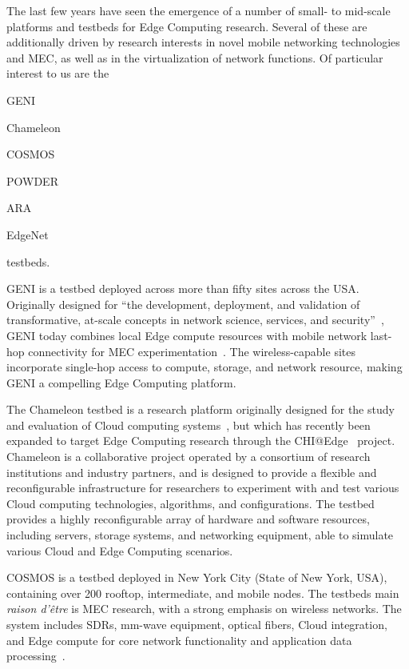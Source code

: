 The last few years have seen the emergence of a number of small- to mid-scale platforms and testbeds for Edge Computing research.
Several of these are additionally driven by research interests in novel mobile networking technologies and \gls{MEC}, as well as in the virtualization of network functions.
Of particular interest to us are the
\begin{inlineenum}
    \item \acs{GENI}
    \item Chameleon
    \item \acs{COSMOS}
    \item \acs{POWDER}
    \item \acs{ARA}
    \item EdgeNet
\end{inlineenum} testbeds.

\gls{GENI} is a testbed deployed across more than fifty sites across the \gls{USA}.
Originally designed for ``the development, deployment, and validation of transformative, at-scale concepts in network science, services, and security''~\cite{berman2014geni}, \gls{GENI} today combines local Edge compute resources with mobile network last-hop connectivity for \gls{MEC} experimentation~\cite{gosain2017geni}.
The wireless-capable sites incorporate single-hop access to compute, storage, and network resource, making \gls{GENI} a compelling Edge Computing platform.

The Chameleon testbed is a research platform originally designed for the study and evaluation of Cloud computing systems~\cite{keahey2020lessons}, but which has recently been expanded to target Edge Computing research through the \acs{CHI}@Edge~\cite{chiatedge} project.
Chameleon is a collaborative project operated by a consortium of research institutions and industry partners, and is designed to provide a flexible and reconfigurable infrastructure for researchers to experiment with and test various Cloud computing technologies, algorithms, and configurations.
The testbed provides a highly reconfigurable array of hardware and software resources, including servers, storage systems, and networking equipment, able to simulate various Cloud and Edge Computing scenarios.

\gls{COSMOS} is a testbed deployed in New York City (State of New York, \gls{USA}), containing over \num{200} rooftop, intermediate, and mobile nodes.
The testbeds main \emph{raison d'être} is \gls{MEC} research, with a strong emphasis on wireless networks.
The system includes \glspl{SDR}, \si{\milli\meter}-wave equipment, optical fibers, Cloud integration, and Edge compute for core network functionality and application data processing~\cite{yu2019cosmos,raychaudhuri2020challenge}.

